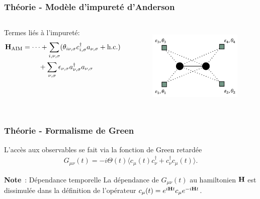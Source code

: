 \begin{frame}
    \frametitle{Théorie - Modèle d'impureté d'Anderson}
    \begin{columns}
        Termes liés à l'impureté:
        {\scriptsize
        \begin{align*}
            \vb{H}_{\text{AIM}} &= \dots + \sum_{i,\nu,\sigma}(\theta_{i\nu,\sigma}c_{i,\sigma}^\dagger a_{\nu,\sigma} + \text{h.c.}) \\
                                &\hspace{0.8cm}+\sum_{\nu,\sigma}\epsilon_{\nu,\sigma}a^\dagger_{\nu,\sigma}a_{\nu,\sigma}
        \end{align*}
        }
        \begin{figure}
           \centering
            \includegraphics[scale=0.2]{./figures/theory/1D_2s_4b_cluster.png}
            \label{fig: 1D_2s_4b_HAIM}
        \end{figure}
    \end{columns}
\end{frame}

\begin{frame}
    \frametitle{Théorie - Formalisme de Green}
    L'accès aux observables se fait via la fonction de Green retardée\footnotemark
    \begin{align}
        G_{\mu\nu}(t) = -i\Theta(t)\langle c_\mu(t)c_\nu^\dagger + c_\nu^\dagger c_\mu(t)\rangle.
        \label{eq: green_retarded}
    \end{align}
    \vspace{1cm}
    \pause
    \begin{mybrownbox}{\textbf{Note}~: Dépendance temporelle}
      La dépendance de $G_{\mu\nu}(t)$ au hamiltonien $\vb{H}$ est dissimulée dans la définition de l'opérateur $c_\mu(t) = e^{i\vb{H}t}c_\mu e^{-i\vb{H}t}$.
    \end{mybrownbox}
\end{frame}

